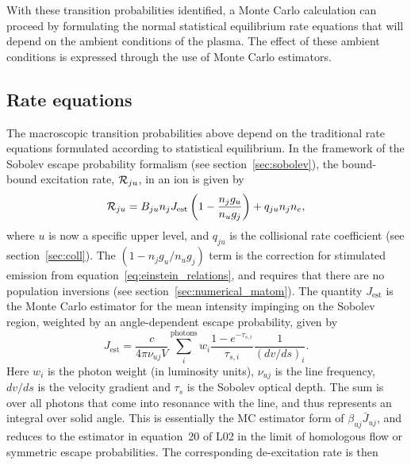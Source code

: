 With these transition
probabilities identified, a Monte Carlo calculation can proceed by formulating
the normal statistical equilibrium rate equations that will depend on
the ambient conditions of the plasma. The effect of these ambient conditions
is expressed through the use of Monte Carlo estimators.




\subsection{Rate equations}
\label{sec:rate_eq}
The macroscopic transition probabilities above depend on the traditional
rate equations formulated according to statistical equilibrium. 
In the framework of the Sobolev escape probability formalism 
(see section~\ref{sec:sobolev}),
the bound-bound excitation rate, ${\cal R}_{ju}$, in an ion is given by 
\begin{equation}
{\cal R}_{ju} = B_{ju} n_j J_{\mathrm{est}} \left(1 - \frac{n_j g_u}{n_u g_j} \right) + q_{ju} n_j n_e,
\label{eq:rju}
\end{equation}
where $u$ is now a specific upper level, and $q_{ju}$ is the collisional
rate coefficient (see section~\ref{sec:coll}). The $(1 - n_j g_u/n_u g_j)$ term
is the correction for stimulated emission from equation~\ref{eq:einstein_relations},
and requires that there are no population inversions (see section~\ref{sec:numerical_matom}).
The quantity $J_{\mathrm{est}}$ is the Monte Carlo estimator for the mean intensity 
impinging on the Sobolev region, weighted by an angle-dependent escape probability, 
given by \citep{sim2004}
\begin{equation}
J_{\mathrm{est}} = \frac{c}{4 \pi \nu_{uj} V} \sum_{i}^{\mathrm{photons}} w_i \frac{1 - e^{-\tau_{s,i}}}{\tau_{s,i}} \frac{1}{(dv/ds)_i}.
\end{equation}
Here $w_i$ is the photon weight (in luminosity units), $\nu_{uj}$
is the line frequency, $dv/ds$ is the velocity gradient and
$\tau_s$ is the Sobolev optical depth.
The sum is over all photons that come into resonance with the line,
and thus represents an integral over solid angle.
This is essentially the MC estimator form of $\beta_{uj}\bar{J}_{uj}$, and
reduces to the estimator in equation~20 of L02 
in the limit of homologous flow or symmetric escape probabilities.
The corresponding de-excitation rate is then 
